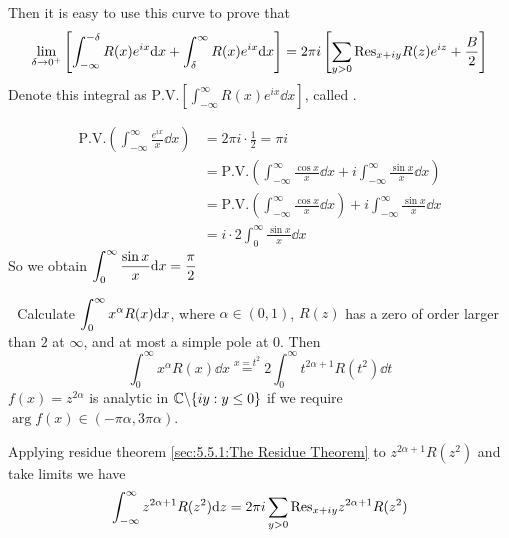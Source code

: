 Then it is easy to use this curve to prove that 
\begin{equation*}
    \lim_{\delta\to 0^+}\left[\int_{-\infty}^{-\delta}R(x)e^{ix}\mathrm{d} x+\int_{\delta}^\infty R(x)e^{ix}\mathrm{d} x\right]=2\pi i \left[\sum_{y>0}\mathrm{Res}_{x+iy}R(z)e^{iz}+\frac{B}{2}\right]
\end{equation*}
Denote this integral as  $ \mathrm{P.V.}\left[\int_{-\infty}^\infty R(x)e^{ix}\dd x\right] $, called .

\begin{example}
    \begin{align*}
        \mathrm{P.V.}\left(\int_{-\infty}^\infty \frac{e^{ix}}{x}\dd x\right)&=2\pi i \cdot\frac{1 }{2}=\pi i\\
        &=\mathrm{P.V.}\left(\int_{-\infty}^\infty \frac{\cos x}{x}\dd x+i\int_{-\infty}^\infty\frac{\sin x}{x}\dd x\right)\\
        &=\mathrm{P.V.}\left(\int_{-\infty}^\infty \frac{\cos x}{x}\dd x\right)+i\int_{-\infty}^\infty \frac{\sin x}{x}\dd x\\
        &=i\cdot 2\int_{0}^\infty\frac{\sin x}{x}\dd x
    \end{align*}
    So we obtain  $ \displaystyle\int_0^\infty\frac{\sin x}{x}\mathrm{d} x=\frac{\pi }{2} $ 
\end{example}
\noindent{}\,\,\,\,Calculate  $ \displaystyle\int_0^\infty x^\alpha R(x)\mathrm{d} x $, where  $ \alpha\in(0,1) $, $ R(z) $ has a zero of order larger than  $ 2 $ at  $ \infty $, and at most a simple pole at  $ 0 $.
Then 
\begin{equation}
    \int_0^\infty x^\alpha R(x)\dd x\overset{x=t^2}{=}2\int_0^\infty t^{2\alpha+1}R(t^2)\dd t
\end{equation}
$ f(x)=z^{2\alpha } $ is analytic in  $ \mathbb C\backslash\{iy:y \leq 0\} $ if we require  $ \arg f(x)\in(-\pi \alpha,3\pi\alpha) $. 

\begin{figure}[!h]
    \centering
\end{figure}

Applying residue theorem \ref{sec:5.5.1:The Residue Theorem} to  $ z^{2\alpha+1}R(z^2) $ and take limits we have 
\begin{equation*}
    \int_{-\infty}^\infty z^{2\alpha+1}R(z^2)\mathrm{d} z=2\pi i\sum_{y>0}\mathrm{Res}_{x+iy}z^{2\alpha+1}R(z^2)
\end{equation*}
